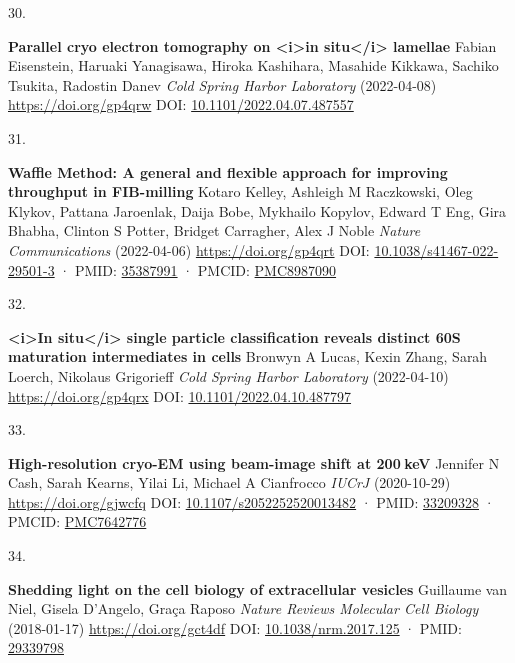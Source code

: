 \documentclass[
]{article}
\newlength{\cslhangindent}
\newlength{\csllabelwidth}
\newlength{\cslentryspacingunit} %
\newenvironment{CSLReferences}[2] %
 {%
  \setlength{\parindent}{0pt}
  \ifodd #1
  \let\oldpar\par
  \def\par{\hangindent=\cslhangindent\oldpar}
  \fi
  \setlength{\parskip}{#2\cslentryspacingunit}
 }%
 {}
\newcommand{\CSLBlock}[1]{#1\hfill\break}
\newcommand{\CSLLeftMargin}[1]{\parbox[t]{\csllabelwidth}{#1}}
\newcommand{\CSLRightInline}[1]{\parbox[t]{\linewidth - \csllabelwidth}{#1}\break}
\begin{document}
\begin{CSLReferences}{0}{0}
\leavevmode{}%
\CSLLeftMargin{30. }%
\CSLRightInline{\textbf{Parallel cryo electron tomography on \textless i\textgreater in situ\textless/i\textgreater{} lamellae}
\CSLBlock{Fabian Eisenstein, Haruaki Yanagisawa, Hiroka Kashihara, Masahide Kikkawa, Sachiko Tsukita, Radostin Danev} \emph{Cold Spring Harbor Laboratory} (2022-04-08) \url{https://doi.org/gp4qrw}
\CSLBlock{DOI: \href{https://doi.org/10.1101/2022.04.07.487557}{10.1101/2022.04.07.487557}}}

\leavevmode{}%
\CSLLeftMargin{31. }%
\CSLRightInline{\textbf{Waffle Method: A general and flexible approach for improving throughput in FIB-milling}
\CSLBlock{Kotaro Kelley, Ashleigh M Raczkowski, Oleg Klykov, Pattana Jaroenlak, Daija Bobe, Mykhailo Kopylov, Edward T Eng, Gira Bhabha, Clinton S Potter, Bridget Carragher, Alex J Noble} \emph{Nature Communications} (2022-04-06) \url{https://doi.org/gp4qrt}
\CSLBlock{DOI: \href{https://doi.org/10.1038/s41467-022-29501-3}{10.1038/s41467-022-29501-3} · PMID: \href{https://www.ncbi.nlm.nih.gov/pubmed/35387991}{35387991} · PMCID: \href{https://www.ncbi.nlm.nih.gov/pmc/articles/PMC8987090}{PMC8987090}}}

\leavevmode{}%
\CSLLeftMargin{32. }%
\CSLRightInline{\textbf{\textless i\textgreater In situ\textless/i\textgreater{} single particle classification reveals distinct 60S maturation intermediates in cells}
\CSLBlock{Bronwyn A Lucas, Kexin Zhang, Sarah Loerch, Nikolaus Grigorieff} \emph{Cold Spring Harbor Laboratory} (2022-04-10) \url{https://doi.org/gp4qrx}
\CSLBlock{DOI: \href{https://doi.org/10.1101/2022.04.10.487797}{10.1101/2022.04.10.487797}}}

\leavevmode{}%
\CSLLeftMargin{33. }%
\CSLRightInline{\textbf{High-resolution cryo-EM using beam-image shift at 200 keV}
\CSLBlock{Jennifer N Cash, Sarah Kearns, Yilai Li, Michael A Cianfrocco} \emph{IUCrJ} (2020-10-29) \url{https://doi.org/gjwcfq}
\CSLBlock{DOI: \href{https://doi.org/10.1107/s2052252520013482}{10.1107/s2052252520013482} · PMID: \href{https://www.ncbi.nlm.nih.gov/pubmed/33209328}{33209328} · PMCID: \href{https://www.ncbi.nlm.nih.gov/pmc/articles/PMC7642776}{PMC7642776}}}

\leavevmode{}%
\CSLLeftMargin{34. }%
\CSLRightInline{\textbf{Shedding light on the cell biology of extracellular vesicles}
\CSLBlock{Guillaume van Niel, Gisela D'Angelo, Graça Raposo} \emph{Nature Reviews Molecular Cell Biology} (2018-01-17) \url{https://doi.org/gct4df}
\CSLBlock{DOI: \href{https://doi.org/10.1038/nrm.2017.125}{10.1038/nrm.2017.125} · PMID: \href{https://www.ncbi.nlm.nih.gov/pubmed/29339798}{29339798}}}


\end{CSLReferences}
\end{document}
